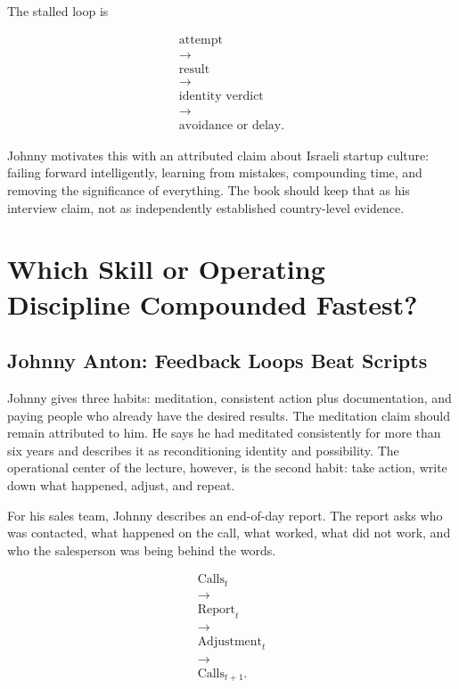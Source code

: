 \documentclass[11pt,oneside]{book}
\begin{document}
The stalled loop is

\begin{equation}
\begin{gathered}
\text{attempt}\\
\rightarrow\\
\text{result}\\
\rightarrow\\
\text{identity verdict}\\
\rightarrow\\
\text{avoidance or delay}.
\end{gathered}
\end{equation}

Johnny motivates this with an attributed claim about Israeli startup culture: failing forward intelligently, learning from mistakes, compounding time, and removing the significance of everything. The book should keep that as his interview claim, not as independently established country-level evidence.

\chapter{Which Skill or Operating Discipline Compounded Fastest?}

\section{Johnny Anton: Feedback Loops Beat Scripts}

Johnny gives three habits: meditation, consistent action plus documentation, and paying people who already have the desired results. The meditation claim should remain attributed to him. He says he had meditated consistently for more than six years and describes it as reconditioning identity and possibility. The operational center of the lecture, however, is the second habit: take action, write down what happened, adjust, and repeat.

For his sales team, Johnny describes an end-of-day report. The report asks who was contacted, what happened on the call, what worked, what did not work, and who the salesperson was being behind the words.

\begin{equation}
\begin{gathered}
\text{Calls}_t\\
\longrightarrow\\
\text{Report}_t\\
\longrightarrow\\
\text{Adjustment}_t\\
\longrightarrow\\
\text{Calls}_{t+1}.
\end{gathered}
\end{equation}
\end{document}
